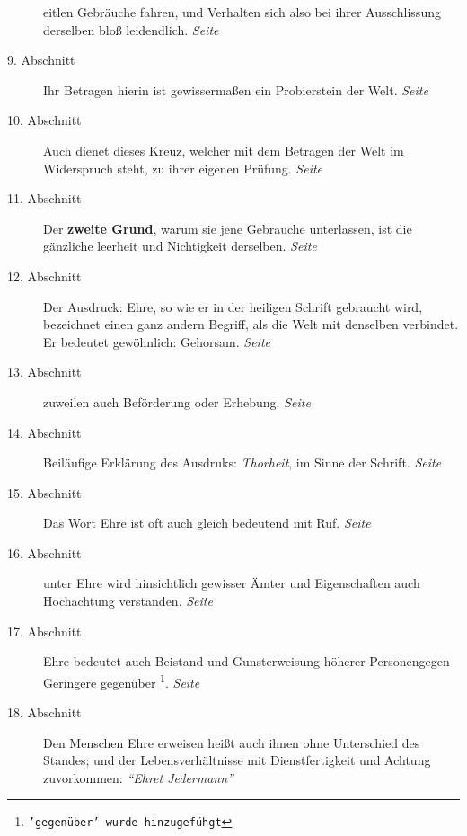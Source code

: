 \begin{description}
eitlen Gebräuche fahren, und Verhalten sich also bei ihrer Ausschlissung
derselben bloß leidendlich.
\dotfill \textit{Seite~\pageref{kap9_ab8}}\\
\item[9. Abschnitt] Ihr Betragen hierin ist gewissermaßen ein Probierstein der
Welt.
\dotfill \textit{Seite~\pageref{kap9_ab9}}\\
\item[10. Abschnitt] Auch dienet dieses Kreuz, welcher mit dem Betragen der Welt
im Widerspruch steht, zu ihrer eigenen Prüfung.
\dotfill \textit{Seite~\pageref{kap9_ab10}}\\
\item[11. Abschnitt] Der \textbf{zweite Grund}, warum sie jene Gebrauche
unterlassen, ist
die gänzliche leerheit und Nichtigkeit derselben.
\dotfill \textit{Seite~\pageref{kap9_ab11}}\\
\item[12. Abschnitt] Der Ausdruck: Ehre, so wie er in der heiligen Schrift
gebraucht wird, bezeichnet einen ganz andern Begriff, als die Welt mit denselben
verbindet. Er bedeutet gewöhnlich: Gehorsam.
\dotfill \textit{Seite~\pageref{kap9_ab12}}\\
\item[13. Abschnitt] zuweilen auch Beförderung oder Erhebung.
\dotfill \textit{Seite~\pageref{kap9_ab13}}\\
\item[14. Abschnitt] Beiläufige Erklärung des Ausdruks: \textit{Thorheit}, im
Sinne
der Schrift.
\dotfill \textit{Seite~\pageref{kap9_ab14}}\\
\item[15. Abschnitt] Das Wort Ehre ist oft auch gleich bedeutend mit Ruf.
\dotfill \textit{Seite~\pageref{kap9_ab15}}\\
\item[16. Abschnitt] unter Ehre wird hinsichtlich gewisser Ämter und
Eigenschaften auch Hochachtung verstanden.
\dotfill \textit{Seite~\pageref{kap9_ab16}}\\
\item[17. Abschnitt] Ehre bedeutet auch Beistand und Gunsterweisung höherer
Personengegen Geringere gegenüber
\footnote{\texttt{'gegenüber' wurde hinzugefühgt}}.
\dotfill \textit{Seite~\pageref{kap9_ab17}}\\
\item[18. Abschnitt]  Den Menschen Ehre erweisen heißt auch ihnen ohne
Unterschied des Standes; und der Lebensverhältnisse mit Dienstfertigkeit und
Achtung zuvorkommen: \textit{"`Ehret Jedermann"'}

\end{description}

